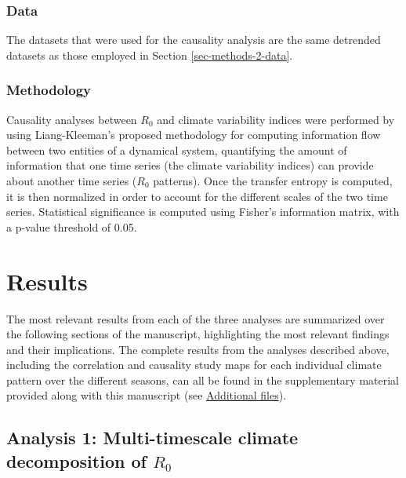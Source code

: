 \documentclass[10pt,twocolumn]{wlscirep}
\begin{document}
\subsubsection{Data} \label{sec-methods-3-data}

The datasets that were used for the causality analysis are the same detrended datasets as those employed in Section \ref{sec-methods-2-data}.

\subsubsection{Methodology} \label{sec-methods-3-methodology}

Causality analyses between $R_0$ and climate variability indices were performed by using Liang-Kleeman's proposed methodology for computing information flow between two entities of a dynamical system, quantifying the amount of information that one time series (the climate variability indices) can provide about another time series ($R_0$ patterns)\cite{liang_2014}. Once the transfer entropy is computed, it is then normalized in order to account for the different scales of the two time series\cite{liang_2015}. Statistical significance is computed using Fisher's information matrix, with a p-value threshold of 0.05.

\section{Results}

The most relevant results from each of the three analyses are summarized over the following sections of the manuscript, highlighting the most relevant findings and their implications. The complete results from the analyses described above, including the correlation and causality study maps for each individual climate pattern over the different seasons, can all be found in the supplementary material provided along with this manuscript (see \hyperref[sec-additional-files]{Additional files}).


\subsection{Analysis 1: Multi-timescale climate decomposition of $R_0$} \label{sec-results-1}
\end{document}
